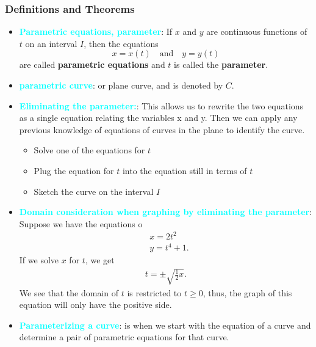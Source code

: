 \documentclass{report}
\begin{document}
    \subsubsection{Definitions and Theorems} 
    \begin{itemize}
        \item \textbf{\textcolor{cyan}{Parametric equations, parameter}}: 
            If \( x \) and \( y \) are continuous functions of \( t \) on an interval \( I \), then the equations
            \[ x = x(t) \quad \text{and} \quad y = y(t) \]
            are called \textbf{parametric equations} and \( t \) is called the \textbf{parameter}. 
        \item \textbf{\textcolor{cyan}{parametric curve}}: or plane curve, and is denoted by \( C \).
        \item \textbf{\textcolor{cyan}{Eliminating the parameter:}}: This allows us to rewrite the two equations as a single equation relating the variables x and y. Then we can apply any previous knowledge of equations of curves in the plane to identify the curve. 
            \begin{itemize}
                \item Solve one of the equations for $t$
                \item Plug the equation for $t$ into the equation still in terms of $t$
                \item Sketch the curve on the interval $I$
            \end{itemize}
        \item \textbf{\textcolor{cyan}{Domain consideration when graphing by eliminating the parameter}}: Suppose we have the equations 
            o\begin{align*}
                &x = 2t^{2} \\
                &y = t^{4} + 1
            .\end{align*}
            If we solve $x$ for $t$, we get 
            \begin{align*}
                 t = \pm \sqrt{\frac{1}{2}x}
            .\end{align*}
            We see that the domain of $t$ is restricted to  $t \geq 0$, thus, the graph of this equation will only have the positive side.
        \item \textbf{\textcolor{cyan}{Parameterizing a curve}}: is when we start with the equation of a curve and determine a pair of parametric equations for that curve.
            \begin{itemize}

\end{itemize}
\end{itemize}
\end{document}
